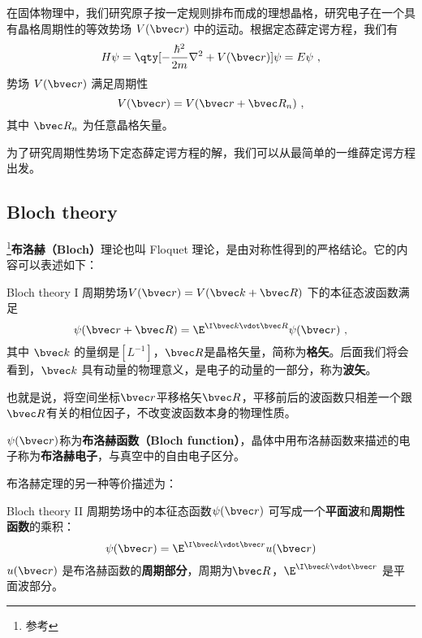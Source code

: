
\begin{issues}
\issueDraft
\end{issues}


在固体物理中，我们研究原子按一定规则排布而成的理想晶格，研究电子在一个具有晶格周期性的等效势场 $V(\bvec r)$ 中的运动。根据定态薛定谔方程，我们有
\begin{equation}\label{eq_Bloch_4}
H\psi=\qty[-\frac{\hbar^2}{2m}\nabla^2+V(\bvec r)] \psi = E\psi~,
\end{equation}
势场 $V(\bvec r)$ 满足周期性
\begin{equation}
V(\bvec r)=V(\bvec r+\bvec R_n)~,
\end{equation}
其中 $\bvec R_n$ 为任意晶格矢量。

为了研究周期性势场下定态薛定谔方程的解，我们可以从最简单的一维薛定谔方程出发。

\subsection{Bloch theory}
\footnote{参考\cite{GriffQ}}\textbf{布洛赫（Bloch）}理论也叫 Floquet 理论，是由对称性得到的严格结论。它的内容可以表述如下：

\begin{theorem}{Bloch theory I}
周期势场$V(\bvec r) = V(\bvec k + \bvec R)$ 下的本征态波函数满足
\begin{equation}\label{eq_Bloch_1}
\psi(\bvec r + \bvec R) = \E^{\I \bvec k \vdot \bvec R}\psi(\bvec r)~,
\end{equation}
其中 $\bvec k$ 的量纲是$[L^{-1}]$，$\bvec R$是晶格矢量，简称为\textbf{格矢}。后面我们将会看到，$\bvec k$ 具有动量的物理意义，是电子的动量的一部分，称为\textbf{波矢}。 
\end{theorem} 

也就是说，将空间坐标$\bvec r$平移格矢$\bvec R$，平移前后的波函数只相差一个跟$\bvec R$有关的相位因子，不改变波函数本身的物理性质。

$\psi (\bvec r)$称为\textbf{布洛赫函数（Bloch function）}，晶体中用布洛赫函数来描述的电子称为\textbf{布洛赫电子}，与真空中的自由电子区分。

布洛赫定理的另一种等价描述为：

\begin{theorem}{Bloch theory II}
周期势场中的本征态函数$\psi(\bvec r)$ 可写成一个\textbf{平面波}和\textbf{周期性函数}的乘积：
\begin{equation}\label{eq_Bloch_2}
\psi(\bvec r) = \E^{\I \bvec k \vdot \bvec r} u(\bvec r)
\end{equation}
$u( \bvec r)$ 是布洛赫函数的\textbf{周期部分}，周期为$\bvec R$，$\E^{\I \bvec k \vdot \bvec r}$ 是平面波部分。
\end{theorem}

